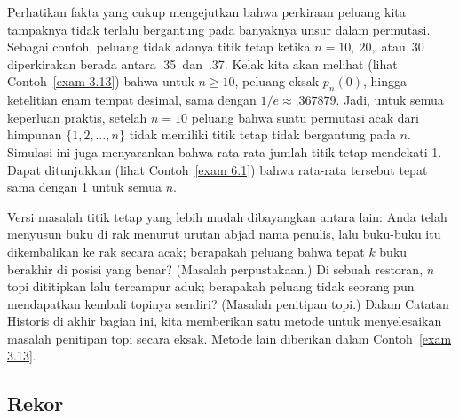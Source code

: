 Perhatikan fakta yang cukup mengejutkan bahwa perkiraan peluang kita tampaknya tidak
terlalu bergantung pada banyaknya unsur dalam permutasi.  Sebagai contoh, peluang tidak
adanya titik tetap ketika $n = 10,\ 20,$ atau~30 diperkirakan berada antara
.35~dan~.37.  Kelak kita akan melihat (lihat Contoh~\ref{exam 3.13}) bahwa untuk
$n \geq 10$, peluang eksak $p_n(0)$, hingga ketelitian enam tempat desimal, sama dengan
$1/e \approx
.367879$.  Jadi, untuk semua keperluan praktis, setelah $n = 10$ peluang
bahwa suatu permutasi acak dari himpunan $\{1, 2, \ldots, n\}$ tidak memiliki titik
tetap tidak bergantung pada $n$.  Simulasi ini juga menyarankan bahwa rata-rata jumlah
titik tetap mendekati 1.  Dapat ditunjukkan (lihat Contoh~\ref{exam 6.1}) bahwa rata-rata
tersebut tepat sama dengan 1 untuk semua $n$.
\par
Versi masalah titik tetap yang lebih mudah dibayangkan antara lain: Anda telah menyusun
buku di rak menurut urutan abjad nama penulis, lalu buku-buku itu dikembalikan ke rak
secara acak; berapakah peluang bahwa tepat $k$ buku berakhir di posisi yang benar?
(Masalah perpustakaan.)  Di sebuah restoran, $n$ topi
dititipkan lalu tercampur aduk; berapakah peluang tidak seorang pun
mendapatkan kembali topinya sendiri?  (Masalah penitipan topi.)
  Dalam Catatan Historis di akhir bagian ini, kita
memberikan satu metode untuk menyelesaikan masalah penitipan topi secara eksak.  Metode
lain diberikan dalam Contoh~\ref{exam 3.13}.  


\subsection*{Rekor}


